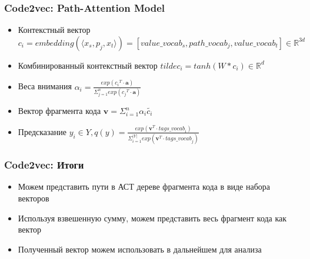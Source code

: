 \documentclass[xcolor=table,english]{beamer}
\begin{document}
\begin{frame}[fragile] \frametitle{Code2vec: Path-Attention Model}
    \begin{itemize}
        \item Контекстный вектор $c_i = embedding(\langle x_s, p_j, x_t \rangle) = [value\_vocab_s, path\_vocab_j, value\_vocab_t] \in \mathbb{R}^{3d}$
        \item Комбинированный контекстный вектор $tilde{c_i} = tanh(W * c_i) \in \mathbb{R}^d$
        \item Веса внимания $\alpha_i = \frac{exp({c_i}^T \cdot \textbf{a})}{\Sigma_{j=1}^n exp({c_j}^T \cdot \textbf{a})}$
        \item Вектор фрагмента кода $\textbf{v} = \Sigma_{i=1}^n \alpha_i \tilde{c_i}$
        \item Предсказание $y_i \in Y, q(y) = \frac{exp(\textbf{v}^T \cdot \textit{tags\_vocab}_i)}{\Sigma_{i=1}^{|Y|} exp(\textbf{v}^T \cdot \textit{tags\_vocab}_j) }$
    \end{itemize}
\end{frame}

\begin{frame}[fragile] \frametitle{Code2vec: Итоги}
    \begin{itemize}
        \item Можем представить пути в АСТ дереве фрагмента кода в виде набора векторов
        \item Используя взвешенную сумму, можем представить весь фрагмент кода как вектор
        \item Полученный вектор можем использовать в дальнейшем для анализа
    \end{itemize}
\end{frame}
\end{document}
